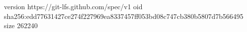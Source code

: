version https://git-lfs.github.com/spec/v1
oid sha256:edd77631427ce274f227969ea8337457ff053bd08c747cb380b5807d7b566495
size 262240
